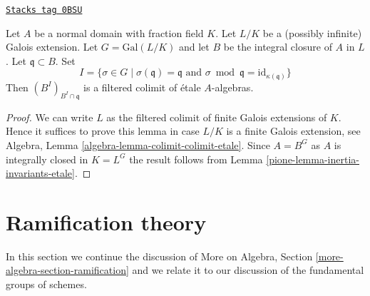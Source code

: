 \begin{lemma}
\label{pione-lemma-inertial-invariants-unramified}
\href{https://stacks.math.columbia.edu/tag/0BSU}{\texttt{Stacks tag 0BSU}}

Let $A$ be a normal domain with fraction field $K$.
Let $L/K$ be a (possibly infinite) Galois extension.
Let $G = \text{Gal}(L/K)$ and let
$B$ be the integral closure of $A$ in $L$.
Let $\mathfrak q \subset B$. Set
$$
I = \{\sigma \in G \mid
\sigma(\mathfrak q) = \mathfrak q \text{ and }
\sigma \bmod \mathfrak q = \text{id}_{\kappa(\mathfrak q)}\}
$$
Then $(B^I)_{B^I \cap \mathfrak q}$ is a filtered colimit
of \'etale $A$-algebras.
\end{lemma}

\begin{proof}

We can write $L$ as the filtered colimit of finite Galois extensions
of $K$. Hence it suffices to prove this lemma in case $L/K$ is
a finite Galois extension, see
Algebra, Lemma \ref{algebra-lemma-colimit-colimit-etale}.
Since $A = B^G$ as $A$ is integrally
closed in $K = L^G$ the result follows from
Lemma \ref{pione-lemma-inertia-invariants-etale}.
\end{proof}

\section{Ramification theory}
\label{pione-section-ramification}
In this section we continue the discussion of
More on Algebra, Section \ref{more-algebra-section-ramification}
and we relate it to our discussion of the fundamental groups of schemes.

